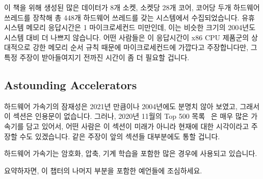 이 책을 위해 생성된 많은 데이터가 8개 소켓, 소켓당 28개 코어, 코어당 두개
하드웨어 쓰레드를 장착해 총 448개 하드웨어 쓰레드를 갖는 시스템에서
수집되었습니다.
유휴 시스템 메모리 응답시간은 1 마이크로세컨드 미만인데, 이는 비슷한 크기의
2004년도 시스템 대비 더 나쁘지 않습니다.
어떤 사람들은 이 응답시간이 x86 CPU 제품군의 상대적으로 강한 메모리 순서 규칙
때문에 마이크로세컨드에 가깝다고 주장합니다만, 그 특정 주장이 받아들여지기
전까진 시간이 좀 더 필요할 겁니다.

\subsection{Astounding Accelerators}
\label{sec:future:Astounding Accelerators}

하드웨어 가속기의 잠재성은 2021년 만큼이나 2004년에도 분명치 않아 보였고,
그래서 이 섹션은 인용문이 없습니다.
그러나, 2020년 11월의 Top 500 목록~\cite{Top500} 은 매우 많은 가속기를 담고
있어서, 어떤 사람은 이 섹션이 미래가 아니라 현재에 대한 시각이라고 주장할 수도
있겠습니다.
같은 주장이 앞의 섹션들 대부분에도 통할 겁니다.

하드웨어 가속기는 암호화, 압축, 기계 학습을 포함한 많은 경우에 사용되고
있습니다.

요약하자면, 이 챕터의 나머지 부분을 포함한 예언들에 조심하세요.

